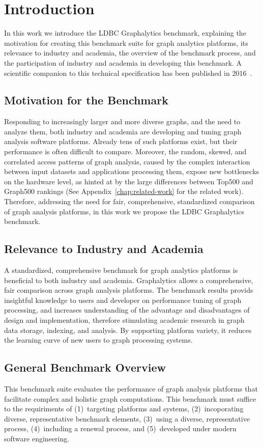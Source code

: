 \chapter{Introduction}
\label{chap:introduction}
In this work we introduce the LDBC Graphalytics benchmark, explaining the motivation for creating this benchmark suite for graph analytics platforms, its relevance to industry and academia, the overview of the benchmark process, and the participation of industry and academia in developing this benchmark. A scientific companion to this technical specification has been published in 2016~\cite{DBLP:journals/pvldb/IosupHNHPMCCSATXNB16}.

\section{Motivation for the Benchmark}
Responding to increasingly larger and more diverse graphs, and the need to analyze them, both industry and academia are developing and tuning graph analysis software platforms. Already tens of such platforms exist,	but their performance is often difficult to compare. Moreover, the random, skewed, and correlated access patterns of graph analysis, caused by the complex interaction between input datasets and applications processing them, expose new bottlenecks on the hardware level, as hinted at by the large differences between Top500 and Graph500 rankings (See Appendix~\ref{chap:related-work} for the related work). Therefore, addressing the need for fair, comprehensive, standardized comparison of graph analysis platforms, in this work we propose the LDBC Graphalytics benchmark.

\section{Relevance to Industry and Academia}
A standardized, comprehensive benchmark for graph analytics platforms is beneficial to both industry and academia. Graphalytics allows a comprehensive, fair comparison across graph analysis platforms. The benchmark results provids insightful knowledge to users and developer on performance tuning of graph processing, and increases understanding of the advantage and disadvantages of design and implementation, therefore stimulating academic research in graph data storage, indexing, and analysis. By supporting platform variety, it reduces the learning curve of new users to graph processing systems.

\section{General Benchmark Overview}
This benchmark suite evaluates the performance of graph analysis platforms that facilitate complex and holistic graph computations. This benchmark must suffice to the requiriments of (1)~targeting platforms and systems, (2)~incoporating diverse, representative benchmark elements, (3)~using a diverse, representative process, (4)~including a renewal process, and (5)~developed under modern software engineering.

